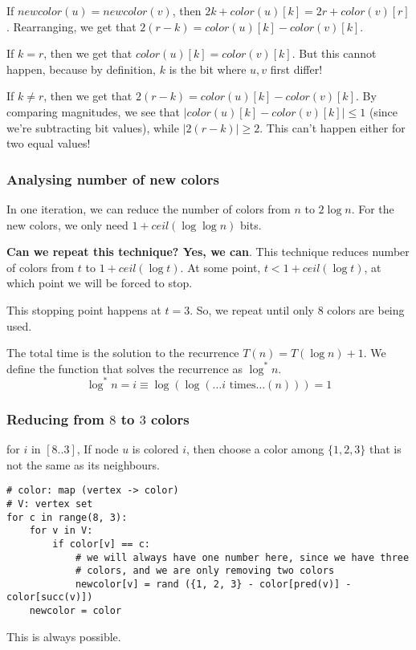 If $newcolor(u) = newcolor(v)$, then $2k + color(u)[k] = 2r + color(v)[r]$.
Rearranging, we get that $2(r - k) = color(u)[k] - color(v)[k]$.


If $k = r$, then we get that $color(u)[k] = color(v)[k]$. But this cannot
happen, because by definition, $k$ is the bit where $u, v$ first differ!


If $k \neq r$, then we get that $2(r - k) = color(u)[k] - color(v)[k]$.
By comparing magnitudes, we see that $\big|color(u)[k] - color(v)[k]\big| \leq 1$
(since we're subtracting bit values), while $\big|2(r - k)\big| \geq 2$. 
This can't happen either for two equal values!

\subsubsection{Analysing number of new colors}
In one iteration, we can reduce the number of colors from $n$ to $2 \log n$.
For the new colors, we only need $1 + ceil(\log \log n)$ bits.

\textbf{Can we repeat this technique? Yes, we can}. This technique reduces number
of colors from $t$ to $1 + ceil(\log t)$. At some point, $t < 1 + ceil(\log t)$,
at which point we will be forced to stop. 

This stopping point happens at $t = 3$. So, we repeat until only $8$ colors
are being used.

The total time is the solution to the recurrence $T(n) = T(\log n) + 1$.
We define the function that solves the recurrence as $\log^* n$.
$$\log^*n = i \equiv \log(\log(\dots \text{$i$ times} \dots (n))) = 1$$


\subsubsection{Reducing from $8$ to $3$ colors}
for $i$ in $[8..3]$, If node $u$ is colored $i$, then choose a color among
$\{1, 2, 3\}$ that is not the same as its neighbours.

\begin{verbatim}
# color: map (vertex -> color)
# V: vertex set
for c in range(8, 3):
    for v in V:
        if color[v] == c:
            # we will always have one number here, since we have three 
            # colors, and we are only removing two colors
            newcolor[v] = rand ({1, 2, 3} - color[pred(v)] - color[succ(v)])
    newcolor = color
\end{verbatim}

This is always possible.


